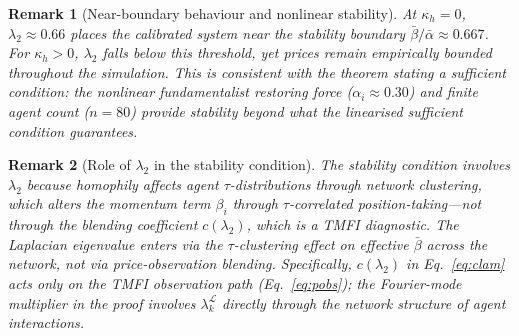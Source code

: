 \documentclass[10pt,twocolumn]{article}
\newtheorem{remark}{Remark}
\begin{document}
\begin{remark}[Near-boundary behaviour and nonlinear stability]
At $\kappa_h = 0$, $\lambda_2 \approx 0.66$ places the calibrated system near the stability boundary $\bar{\beta}/\bar{\alpha} \approx 0.667$.  For $\kappa_h > 0$, $\lambda_2$ falls below this threshold, yet prices remain empirically bounded throughout the simulation.  This is consistent with the theorem stating a \emph{sufficient} condition: the nonlinear fundamentalist restoring force ($\alpha_i \approx 0.30$) and finite agent count ($n=80$) provide stability beyond what the linearised sufficient condition guarantees.
\end{remark}

\begin{remark}[Role of $\lambda_2$ in the stability condition]
The stability condition involves $\lambda_2$ because homophily affects agent $\tau$-distributions through network clustering, which alters the momentum term $\beta_i$ through $\tau$-correlated position-taking---not through the blending coefficient $c(\lambda_2)$, which is a TMFI diagnostic.  The Laplacian eigenvalue enters via the $\tau$-clustering effect on effective $\bar{\beta}$ across the network, not via price-observation blending.  Specifically, $c(\lambda_2)$ in Eq.~\eqref{eq:clam} acts only on the TMFI observation path (Eq.~\eqref{eq:pobs}); the Fourier-mode multiplier in the proof involves $\lambda_k^{\mathcal{L}}$ directly through the network structure of agent interactions.
\end{remark}
\end{document}
